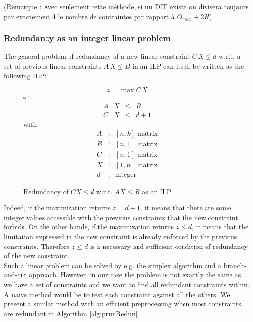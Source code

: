 \documentclass[conference]{IEEEtran}
\begin{document}
(Remarque : Avec seulement cette méthode, si un DIT existe on divisera toujours par exactement 4 le nombre de contraintes par rapport à $O_{max} + 2H$)

\subsubsection{Redundancy as an integer linear problem}

The general problem of redundancy of a new linear constraint $C \, X \leq d$ w.r.t. a set of previous linear constraints $A \, X \leq B$ in an ILP can itself be written as the following ILP:

\begin{figure}[h]
$$z = \max C \, X$$
s.t.
\[
\begin{array}{rccc}
  A & X &\leq & B \\
  C & X &\leq & d + 1
\end{array}
\]
with
\[
  \begin{array}{ccc}
    A & : & [n,k] \text{ matrix}\\
    B & : & [n,1] \text{ matrix}\\
    C & : & [n,1] \text{ matrix}\\
    X & : & [1,n] \text{ matrix}\\
    d & : & \text{integer}
  \end{array}
\]
\caption{Redundancy of $CX \leq d$ w.r.t. $A X \leq B$ as an ILP}
\end{figure}

Indeed, if the maximization returns $z=d+1$, it means that there are some integer values accessible with the previous constraints that the new constraint forbids. On the other hands, if the maximization returns $z \leq d$, it means that the limitation expressed in the new constraint is already enforced by the previous constraints. Therefore $z \leq d$ is a necessary and sufficient condition of redundancy of the new constraint.\\

Such a linear problem can be solved by e.g. the simplex algorithm and a branch-and-cut approach. However, in our case the problem is not exactly the same as we have a set of constraints and we want to find all redundant constraints within. A naive method would be to test each constraint against all the others. We present a similar method with an efficient preprocessing when most constraints are redundant in Algorithm \ref{alg:prunRedun}.\\
\end{document}
